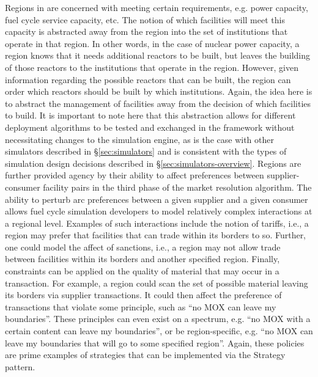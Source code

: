 Regions in \Cyclus are concerned with meeting certain requirements, e.g. power
capacity, fuel cycle service capacity, etc. The notion of which facilities will
meet this capacity is abstracted away from the region into the set of
institutions that operate in that region. In other words, in the case of nuclear
power capacity, a region knows that it needs additional reactors to be built,
but leaves the building of those reactors to the institutions that operate in
the region. However, given information regarding the possible reactors that can
be built, the region can order which reactors should be built by which
institutions. Again, the idea here is to abstract the management of facilities
away from the decision of which facilities to build. It is important to note
here that this abstraction allows for different deployment algorithms to be
tested and exchanged in the \Cyclus framework without necessitating changes to
the simulation engine, as is the case with other simulators described
in \S\ref{sec:simulators} and is consistent with the types of simulation design
decisions described in \S\ref{sec:simulators-overview}. Regions are further
provided agency by their ability to affect preferences between supplier-consumer
facility pairs in the third phase of the market resolution algorithm. The
ability to perturb arc preferences between a given supplier and a given consumer
allows fuel cycle simulation developers to model relatively complex interactions
at a regional level. Examples of such interactions include the notion of
tariffs, i.e., a region may prefer that facilities that can trade within its
borders to so. Further, one could model the affect of sanctions, i.e., a region
may not allow trade between facilities within its borders and another specified
region. Finally, constraints can be applied on the quality of material that may
occur in a transaction. For example, a region could scan the set of possible
material leaving its borders via supplier transactions. It could then affect the
preference of transactions that violate some principle, such as ``no MOX can
leave my boundaries''. These principles can even exist on a spectrum, e.g. ``no
MOX with a certain content can leave my boundaries'', or be region-specific,
e.g. ``no MOX can leave my boundaries that will go to some specified
region''. Again, these policies are prime examples of strategies that can be
implemented via the Strategy pattern.
